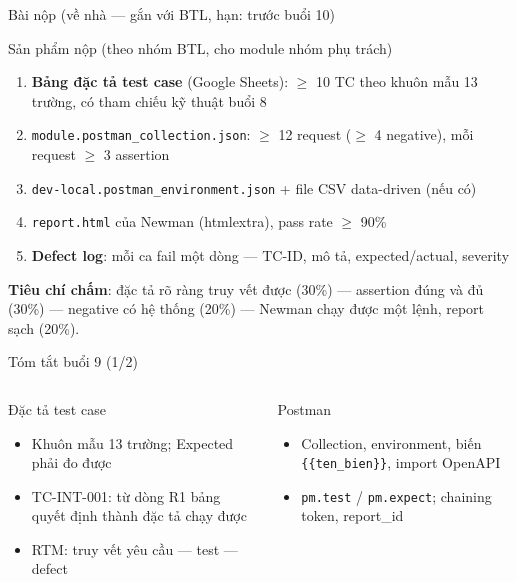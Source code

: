 \documentclass[aspectratio=169,12pt]{beamer}
\begin{document}
\begin{frame}{Bài nộp (về nhà --- gắn với BTL, hạn: trước buổi 10)}
  \begin{block}{Sản phẩm nộp (theo nhóm BTL, cho module nhóm phụ trách)}
    \begin{enumerate}
      \item \textbf{Bảng đặc tả test case} (Google Sheets): \(\geq\) 10 TC
        theo khuôn mẫu 13 trường, có tham chiếu kỹ thuật buổi 8
      \item \texttt{module.postman\_collection.json}: \(\geq\) 12 request
        (\(\geq\) 4 negative), mỗi request \(\geq\) 3 assertion
      \item \texttt{dev-local.postman\_environment.json}
        + file CSV data-driven (nếu có)
      \item \texttt{report.html} của Newman (htmlextra), pass rate \(\geq\) 90\%
      \item \textbf{Defect log}: mỗi ca fail một dòng --- TC-ID, mô tả,
        expected/actual, severity
    \end{enumerate}
  \end{block}

  {\small \textbf{Tiêu chí chấm}: đặc tả rõ ràng truy vết được (30\%) ---
  assertion đúng và đủ (30\%) --- negative có hệ thống (20\%) --- Newman chạy
  được một lệnh, report sạch (20\%).}
\end{frame}

\begin{frame}{Tóm tắt buổi 9 (1/2)}
  \begin{columns}[T]
    \begin{block}{Đặc tả test case}
      \begin{itemize}
        \item Khuôn mẫu 13 trường; Expected phải đo được
        \item TC-INT-001: từ dòng R1 bảng quyết định thành đặc tả chạy được
        \item RTM: truy vết yêu cầu --- test --- defect
      \end{itemize}
    \end{block}

    \begin{block}{Postman}
      \begin{itemize}
        \item Collection, environment, biến \texttt{\{\{ten\_bien\}\}},
              import OpenAPI
        \item \texttt{pm.test} / \texttt{pm.expect}; chaining token, report\_id
      \end{itemize}
    \end{block}
  \end{columns}
\end{frame}
\end{document}
